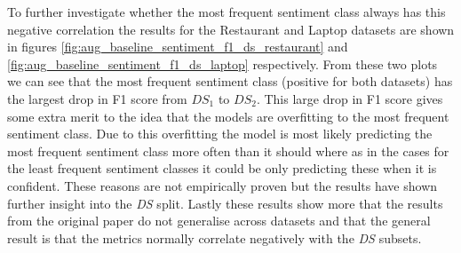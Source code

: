 To further investigate whether the most frequent sentiment class always has this negative correlation the results for the Restaurant and Laptop datasets are shown in figures \ref{fig:aug_baseline_sentiment_f1_ds_restaurant} and \ref{fig:aug_baseline_sentiment_f1_ds_laptop} respectively. From these two plots we can see that the most frequent sentiment class (positive for both datasets) has the largest drop in F1 score from $DS_1$ to $DS_2$. This large drop in F1 score gives some extra merit to the idea that the models are overfitting to the most frequent sentiment class. Due to this overfitting the model is most likely predicting the most frequent sentiment class more often than it should where as in the cases for the least frequent sentiment classes it could be only predicting these when it is confident. These reasons are not empirically proven but the results have shown further insight into the \textit{DS} split. Lastly these results show more that the results from the original paper \citet{aug_wang-etal-2017-tdparse} do not generalise across datasets and that the general result is that the metrics normally correlate negatively with the \textit{DS} subsets. 

